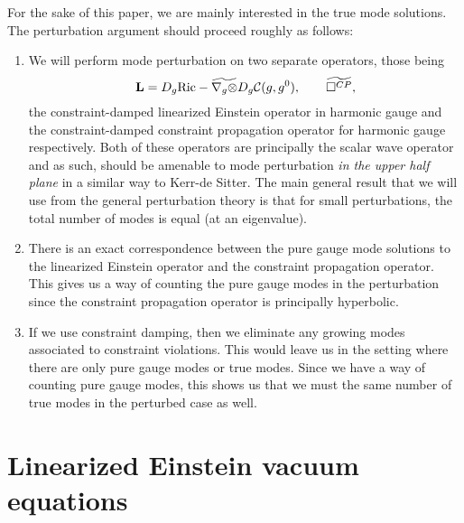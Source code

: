 \documentclass{article}
\begin{document}
For the sake of this paper, we are mainly interested in the true mode
solutions. The perturbation argument should proceed roughly as follows:
\begin{enumerate}
\item We will perform mode perturbation on two separate operators,
  those being  
  \begin{equation*}
    \mathbf{L} = D_g\text{Ric} - \widetilde{\nabla_g\otimes} D_g\mathcal{C}(g, g^0),\qquad
    \widetilde{\Box^{CP}},
  \end{equation*}
  the constraint-damped linearized Einstein operator in harmonic gauge
  and the constraint-damped constraint propagation operator for
  harmonic gauge respectively. Both of these operators are principally
  the scalar wave operator and as such, should be amenable to mode
  perturbation \emph{in the upper half plane} in a similar way to
  Kerr-de Sitter. The main general result that we will use from the general
  perturbation theory is that for small perturbations, the total
  number of modes is equal (at an eigenvalue). 
  
\item There is an exact correspondence between the pure gauge mode
  solutions to the linearized Einstein operator and the constraint
  propagation operator. This gives us a way of counting the pure gauge
  modes in the perturbation since the constraint propagation operator
  is principally hyperbolic.
  
\item If we use constraint damping, then we eliminate any growing
  modes associated to constraint violations. This would leave us in
  the setting where there are only pure gauge modes or true
  modes. Since we have a way of counting pure gauge modes, this shows
  us that we must the same number of true modes in the perturbed case
  as well.
\end{enumerate}

\section{Linearized Einstein vacuum equations}
\label{sec:lin-eve}
\end{document}
